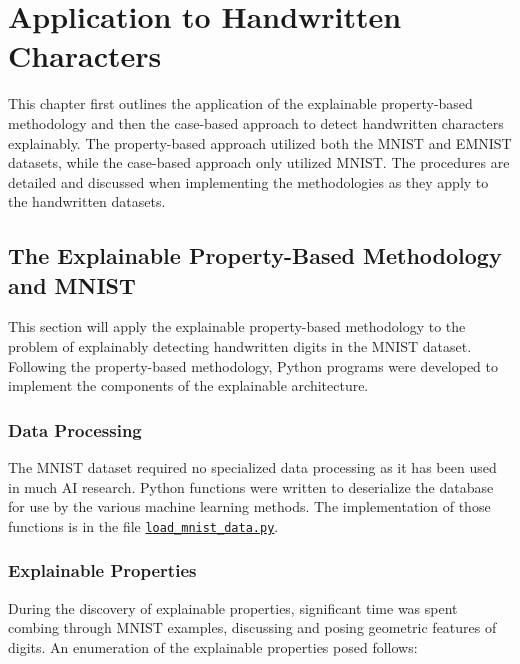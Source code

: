 \chapter{Application to Handwritten Characters} \label{ch:handwriting}

This chapter first outlines the application of the explainable property-based
methodology and then the case-based approach to detect handwritten characters
explainably. The property-based approach utilized both the MNIST and EMNIST
datasets, while the case-based approach only utilized MNIST. The
procedures are detailed and discussed when implementing the methodologies as
they apply to the handwritten datasets.

\section{The Explainable Property-Based Methodology and MNIST}

This section will apply the explainable property-based methodology to the
problem of explainably detecting handwritten digits in the MNIST dataset.
Following the property-based methodology, Python programs were developed to
implement the components of the explainable architecture.

\subsection{Data Processing}

The MNIST dataset required no specialized data processing as it has been used in
much AI research. Python functions were written to deserialize the database for
use by the various machine learning methods. The implementation of those
functions is in the file
\href{https://gitlab.com/paulwhitten/2023-svm-xai/-/blob/main/load_mnist_data.py}{\texttt{load\_mnist\_data.py}}\cite{whitten2024icmi_source}.

\subsection{Explainable Properties}

During the discovery of explainable properties, significant time was spent
combing through MNIST examples, discussing and posing geometric features of
digits. An enumeration of the explainable properties posed follows:

